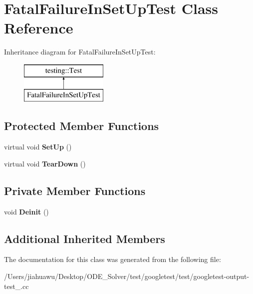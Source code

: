 \hypertarget{class_fatal_failure_in_set_up_test}{}\section{Fatal\+Failure\+In\+Set\+Up\+Test Class Reference}
\label{class_fatal_failure_in_set_up_test}
Inheritance diagram for Fatal\+Failure\+In\+Set\+Up\+Test\+:\begin{figure}[H]
\begin{center}
\leavevmode
\includegraphics[height=2.000000cm]{class_fatal_failure_in_set_up_test}
\end{center}
\end{figure}
\subsection*{Protected Member Functions}
\begin{DoxyCompactItemize}
\item 
\mbox{\label{class_fatal_failure_in_set_up_test_a455696f86fb5f5393624221ccb79b373}} 
virtual void {\bfseries Set\+Up} ()
\item 
\mbox{\label{class_fatal_failure_in_set_up_test_a457707161063e08f7b6600ec5db449e4}} 
virtual void {\bfseries Tear\+Down} ()
\end{DoxyCompactItemize}
\subsection*{Private Member Functions}
\begin{DoxyCompactItemize}
\item 
\mbox{\label{class_fatal_failure_in_set_up_test_a15b9ce9af7b34582b95871af4f8a97a4}} 
void {\bfseries Deinit} ()
\end{DoxyCompactItemize}
\subsection*{Additional Inherited Members}


The documentation for this class was generated from the following file\+:\begin{DoxyCompactItemize}
\item 
/\+Users/jiahuawu/\+Desktop/\+O\+D\+E\+\_\+\+Solver/test/googletest/test/googletest-\/output-\/test\+\_\+.\+cc\end{DoxyCompactItemize}
